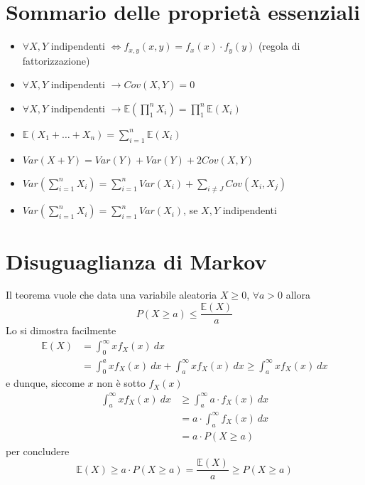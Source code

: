 \documentclass[11pt]{report}
\begin{document}
\section{Sommario delle proprietà essenziali}
\begin{itemize}
	\item $\forall X,Y$ indipendenti $\iff f_{x,y}(x,y) = f_x(x)\cdot f_y(y)$ (regola di fattorizzazione)
    \item $\forall X,Y$ indipendenti $\to Cov(X,Y)=0$
    \item $\forall X,Y$ indipendenti $\to \mathbb{E} \left( \prod_1^n X_i \right)=\prod_1^n\mathbb{E}(X_i)$
    \item $\mathbb{E}(X_1 + \dots + X_n) = \sum_{i=1}^{n} \mathbb{E}(X_i)$
    \item $Var(X+Y) = Var(Y)+Var(Y)+2Cov(X,Y)$
    \item $Var\left( \sum_{i=1}^n X_i \right) = \sum_{i=1}^n Var(X_i) + \sum_{i \neq J}Cov(X_i,X_j)$
    \item $Var\left( \sum_{i=1}^n X_i \right) = \sum_{i=1}^n Var(X_i)$, se $X,Y$ indipendenti
\end{itemize}

\section{Disuguaglianza di Markov}
Il teorema vuole che data una variabile aleatoria $X \geq 0$, $\forall a > 0$ allora
\begin{equation}
    P(X \geq a) \leq \frac{\mathbb{E}(X)}{a}
\end{equation}
Lo si dimostra facilmente
\begin{equation}
    \begin{split}
        \mathbb{E}(X) & = \int_{0}^{\infty} x f_X(x)\ dx\\
        & = \int_{0}^{a} x f_X(x)\ dx + \int_{a}^{\infty} x f_X(x)\ dx \geq \int_{a}^{\infty} x f_X(x)\ dx
    \end{split}
\end{equation}
e dunque, siccome $x$ non è sotto $f_X(x)$
\begin{equation}
    \begin{split}
        \int_{a}^{\infty} x f_X(x)\ dx & \geq \int_{a}^{\infty} a \cdot f_X(x)\ dx\\
        & = a \cdot \int_{a}^{\infty} f_X(x)\ dx\\
        & = a \cdot P(X \geq a)
    \end{split}
\end{equation}
per concludere
\begin{equation}
    \mathbb{E}(X) \geq a \cdot P(X \geq a) = \frac{\mathbb{E}(X)}{a} \geq P(X \geq a)
\end{equation}
\end{document}
